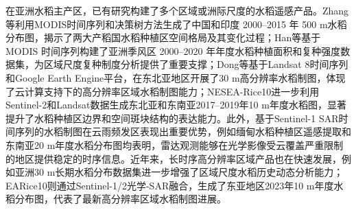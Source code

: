 在亚洲水稻主产区，已有研究构建了多个区域或洲际尺度的水稻遥感产品。Zhang等利用MODIS时间序列和决策树方法生成了中国和印度 2000--2015 年 500 m水稻分布图，揭示了两大产稻国水稻种植区空间格局及其变化过程\cite{Zhang2017STOTEN}；Han等基于 MODIS 时间序列构建了亚洲季风区 2000--2020 年年度水稻种植面积和复种强度数据集，为区域尺度复种制度分析提供了重要支撑\cite{Han2022AsianMonsoonRice}；Dong等基于Landsat 8时间序列和Google Earth Engine平台，在东北亚地区开展了30 m高分辨率水稻制图，体现了云计算支持下的高分辨率区域水稻制图能力\cite{Dong2016RSEGEE}；NESEA-Rice10进一步利用Sentinel-2和Landsat数据生成东北亚和东南亚2017--2019年10 m年度水稻图，显著提升了水稻种植区边界和空间斑块结构的表达能力\cite{Han2021}。此外，基于Sentinel-1 SAR时间序列的水稻制图在云雨频发区表现出重要优势，例如缅甸水稻种植区遥感提取和东南亚20 m年度水稻分布图均表明，雷达观测能够在光学影像受云覆盖严重限制的地区提供稳定的时序信息\cite{Torbick2017,Sun2023SEAsiaRice20m}。近年来，长时序高分辨率区域产品也在快速发展，例如亚洲30 m长期水稻分布数据集进一步增强了区域尺度水稻历史动态分析能力\cite{Li2025SciData}；EARice10则通过Sentinel-1/2光学-SAR融合，生成了东亚地区2023年10 m年度水稻分布图，代表了最新高分辨率区域水稻制图进展\cite{Song2025EARice10}。

